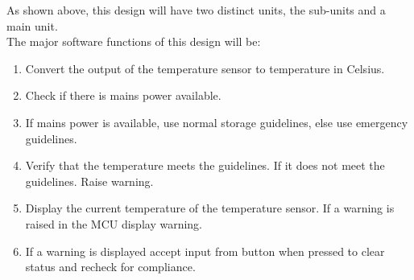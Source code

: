 As shown above, this design will have two distinct units, the sub-units and a main unit.\\
The major software functions of this design will be:
\begin{enumerate}
  \item Convert the output of the temperature sensor to temperature in Celsius.
        \item Check if there is mains power available.
        \item If mains power is available, use normal storage guidelines, else use emergency guidelines.
        \item Verify that the temperature meets the guidelines. If it does not meet the guidelines. Raise warning.
        \item Display the current temperature of the temperature sensor. If a warning is raised in the MCU display warning.
        \item If a warning is displayed accept input from button when pressed to clear status and recheck for compliance.
\end{enumerate}
